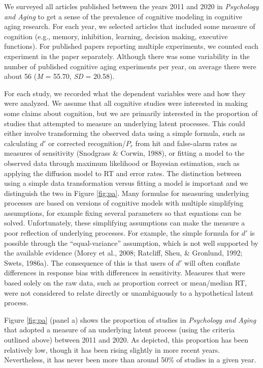 \documentclass[
  english,
  ,man,floatsintext]{apa6}
\begin{document}
We surveyed all articles published between the years 2011 and 2020 in \emph{Psychology and Aging} to get a sense of the prevalence of cognitive modeling in cognitive aging research. For each year, we selected articles that included some measure of cognition (e.g., memory, inhibition, learning, decision making, executive functions). For published papers reporting multiple experiments, we counted each experiment in the paper separately. Although there was some variability in the number of published cognitive aging experiments per year, on average there were about 56 (\emph{M} = 55.70, \emph{SD} = 20.58).

For each study, we recorded what the dependent variables were and how they were analyzed. We assume that all cognitive studies were interested in making some claims about cognition, but we are primarily interested in the proportion of studies that attempted to measure an underlying latent processes. This could either involve transforming the observed data using a simple formula, such as calculating \(d'\) or corrected recognition/\(P_r\) from hit and false-alarm rates as measures of sensitivity (Snodgrass \& Corwin, 1988), or fitting a model to the observed data through maximum likelihood or Bayesian estimation, such as applying the diffusion model to RT and error rates. The distinction between using a simple data transformation versus fitting a model is important and we distinguish the two in Figure \ref{fig:pa}. Many formulae for measuring underlying processes are based on versions of cognitive models with multiple simplifying assumptions, for example fixing several parameters so that equations can be solved. Unfortunately, these simplifying assumptions can make the measure a poor reflection of underlying processes. For example, the simple formula for \(d'\) is possible through the \enquote{equal-variance} assumption, which is not well supported by the available evidence (Morey et al., 2008; Ratcliff, Sheu, \& Gronlund, 1992; Swets, 1986a). The consequence of this is that users of \(d'\) will often conflate differences in response bias with differences in sensitivity. Measures that were based solely on the raw data, such as proportion correct or mean/median RT, were not considered to relate directly or unambiguously to a hypothetical latent process.

Figure \ref{fig:pa} (panel a) shows the proportion of studies in \emph{Psychology and Aging} that adopted a measure of an underlying latent process (using the criteria outlined above) between 2011 and 2020. As depicted, this proportion has been relatively low, though it has been rising slightly in more recent years. Nevertheless, it has never been more than around 50\% of studies in a given year.
\end{document}
